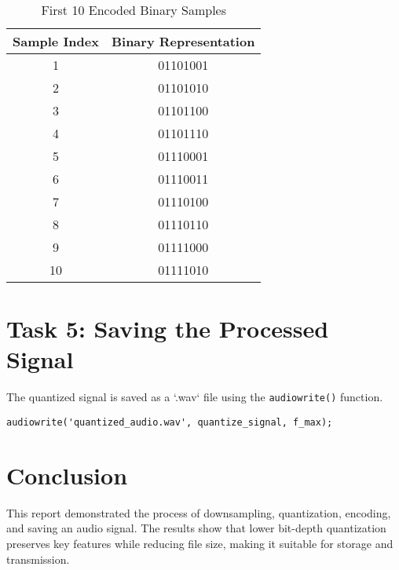 \documentclass[a4paper,12pt]{article}
\begin{document}
\begin{table}[H]
    \centering
    \begin{tabular}{|c|c|}
        \hline
        \textbf{Sample Index} & \textbf{Binary Representation} \\
        \hline
        1  & 01101001 \\
        2  & 01101010 \\
        3  & 01101100 \\
        4  & 01101110 \\
        5  & 01110001 \\
        6  & 01110011 \\
        7  & 01110100 \\
        8  & 01110110 \\
        9  & 01111000 \\
        10 & 01111010 \\
        \hline
    \end{tabular}
    \caption{First 10 Encoded Binary Samples}
    \label{tab:binary_samples}
\end{table}

\section{Task 5: Saving the Processed Signal}
The quantized signal is saved as a `.wav` file using the \texttt{audiowrite()} function.

\begin{lstlisting}[style=matlab, caption=Saving the Processed Signal]
audiowrite('quantized_audio.wav', quantize_signal, f_max);
\end{lstlisting}

\section{Conclusion}
This report demonstrated the process of downsampling, quantization, encoding, and saving an audio signal. The results show that lower bit-depth quantization preserves key features while reducing file size, making it suitable for storage and transmission.
\end{document}
